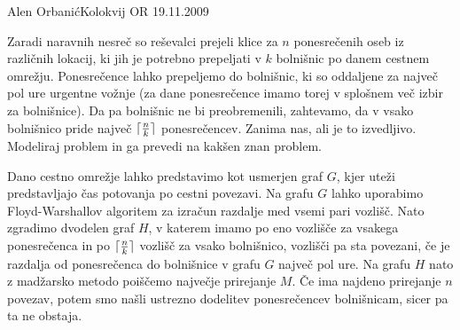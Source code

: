 \begin{naloga}{Alen Orbanić}{Kolokvij OR 19.11.2009}
\begin{vprasanje}
Zaradi naravnih nesreč so reševalci prejeli klice
za $n$ ponesrečenih oseb iz različnih lokacij,
ki jih je potrebno prepeljati v $k$ bolnišnic po danem cestnem omrežju.
Ponesrečence lahko prepeljemo do bolnišnic,
ki so oddaljene za največ pol ure urgentne vožnje
(za dane ponesrečence imamo torej v splošnem več izbir za bolnišnice).
Da pa bolnišnic ne bi preobremenili, zahtevamo,
da v vsako bol\-niš\-ni\-co
pride največ $\lceil {n \over k} \rceil$ ponesrečencev.
Zanima nas, ali je to izvedljivo.
Modeliraj problem in ga prevedi na kakšen znan problem.
\end{vprasanje}

\begin{odgovor}
Dano cestno omrežje lahko predstavimo kot usmerjen graf $G$,
kjer uteži predstavljajo čas potovanja po cestni povezavi.
Na grafu $G$ lahko uporabimo Floyd-Warshallov algoritem
za izračun razdalje med vsemi pari vozlišč.
Nato zgradimo dvodelen graf $H$,
v katerem imamo po eno vozlišče za vsakega ponesrečenca
in po $\lceil {n \over k} \rceil$ vozlišč za vsako bolnišnico,
vozlišči pa sta povezani,
če je razdalja od ponesrečenca do bolnišnice v grafu $G$ največ pol ure.
Na grafu $H$ nato z madžarsko metodo poiščemo največje prirejanje $M$.
Če ima najdeno prirejanje $n$ povezav,
potem smo našli ustrezno dodelitev ponesrečencev bolnišnicam,
sicer pa ta ne obstaja.
\end{odgovor}
\end{naloga}
